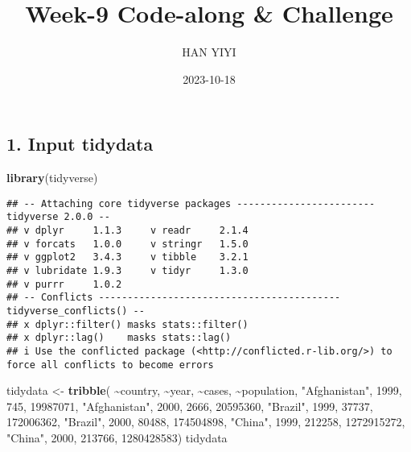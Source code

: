 \documentclass[
]{article}
\title{Week-9 Code-along \& Challenge}
\author{HAN YIYI}
\date{2023-10-18}
\newenvironment{Shaded}{\begin{snugshade}}{\end{snugshade}}
\newcommand{\DecValTok}[1]{\textcolor[rgb]{0.00,0.00,0.81}{#1}}
\newcommand{\FunctionTok}[1]{\textcolor[rgb]{0.13,0.29,0.53}{\textbf{#1}}}
\newcommand{\NormalTok}[1]{#1}
\newcommand{\OtherTok}[1]{\textcolor[rgb]{0.56,0.35,0.01}{#1}}
\newcommand{\SpecialCharTok}[1]{\textcolor[rgb]{0.81,0.36,0.00}{\textbf{#1}}}
\newcommand{\StringTok}[1]{\textcolor[rgb]{0.31,0.60,0.02}{#1}}
\begin{document}
\maketitle

\hypertarget{input-tidydata}{%
\subsection{1. Input tidydata}\label{input-tidydata}}

\begin{Shaded}
\begin{Highlighting}[]
\FunctionTok{library}\NormalTok{(tidyverse)}
\end{Highlighting}
\end{Shaded}

\begin{verbatim}
## -- Attaching core tidyverse packages ------------------------ tidyverse 2.0.0 --
## v dplyr     1.1.3     v readr     2.1.4
## v forcats   1.0.0     v stringr   1.5.0
## v ggplot2   3.4.3     v tibble    3.2.1
## v lubridate 1.9.3     v tidyr     1.3.0
## v purrr     1.0.2     
## -- Conflicts ------------------------------------------ tidyverse_conflicts() --
## x dplyr::filter() masks stats::filter()
## x dplyr::lag()    masks stats::lag()
## i Use the conflicted package (<http://conflicted.r-lib.org/>) to force all conflicts to become errors
\end{verbatim}

\begin{Shaded}
\begin{Highlighting}[]
\NormalTok{tidydata }\OtherTok{\textless{}{-}} \FunctionTok{tribble}\NormalTok{(}
\SpecialCharTok{\textasciitilde{}}\NormalTok{country, }\SpecialCharTok{\textasciitilde{}}\NormalTok{year, }\SpecialCharTok{\textasciitilde{}}\NormalTok{cases, }\SpecialCharTok{\textasciitilde{}}\NormalTok{population,}
\StringTok{"Afghanistan"}\NormalTok{, }\DecValTok{1999}\NormalTok{, }\DecValTok{745}\NormalTok{, }\DecValTok{19987071}\NormalTok{,}
\StringTok{"Afghanistan"}\NormalTok{, }\DecValTok{2000}\NormalTok{, }\DecValTok{2666}\NormalTok{, }\DecValTok{20595360}\NormalTok{,}
\StringTok{"Brazil"}\NormalTok{, }\DecValTok{1999}\NormalTok{, }\DecValTok{37737}\NormalTok{, }\DecValTok{172006362}\NormalTok{,}
\StringTok{"Brazil"}\NormalTok{, }\DecValTok{2000}\NormalTok{, }\DecValTok{80488}\NormalTok{, }\DecValTok{174504898}\NormalTok{,}
\StringTok{"China"}\NormalTok{, }\DecValTok{1999}\NormalTok{, }\DecValTok{212258}\NormalTok{, }\DecValTok{1272915272}\NormalTok{,}
\StringTok{"China"}\NormalTok{, }\DecValTok{2000}\NormalTok{, }\DecValTok{213766}\NormalTok{, }\DecValTok{1280428583}\NormalTok{)}
\NormalTok{tidydata}
\end{Highlighting}
\end{Shaded}
\end{document}
